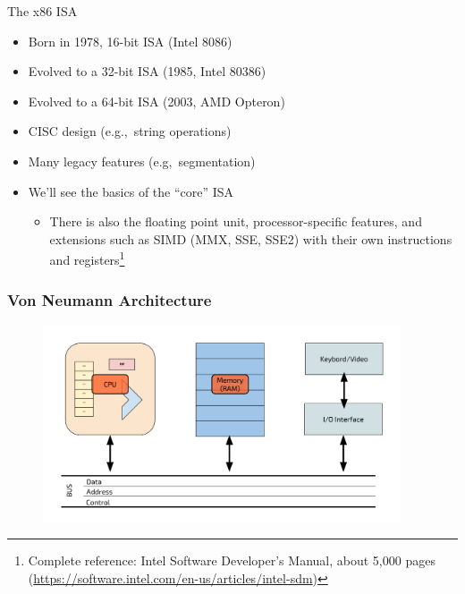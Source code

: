 \documentclass[]{beamer}
\begin{document}
\begin{frame}{The x86 ISA}
\begin{itemize}
	\item Born in 1978, 16-bit ISA (Intel 8086)
	\item Evolved to a 32-bit ISA (1985, Intel 80386)
	\item Evolved to a 64-bit ISA (2003, AMD Opteron)
	\item CISC design (e.g.,~string operations)
	\item Many legacy features (e.g,~segmentation)
	\item We'll see the basics of the ``core'' ISA
		\begin{itemize}
			\item There is also the floating point unit, processor-specific features, and extensions such as SIMD (MMX, SSE, SSE2) with their own instructions and registers\footnote{Complete reference: Intel Software Developer's Manual, about 5,000 pages (\url{https://software.intel.com/en-us/articles/intel-sdm})}
		\end{itemize}
\end{itemize}
\end{frame}

\begin{frame}
  \frametitle{Von Neumann Architecture}
  \begin{figure}
      \includegraphics[height=2.3in]{images/Von-Neumann-architecture.pdf}
    \end{figure}
\end{frame}
\end{document}
